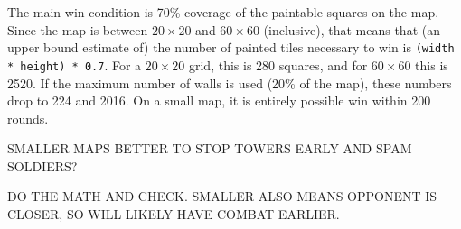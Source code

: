 \documentclass{article}
\begin{document}
  The main win condition is 70\% coverage of the paintable squares on the map. Since the map is between $20 \times 20$ and $60 \times 60$ (inclusive), that means that (an upper bound estimate of) the number of painted tiles necessary to win is \verb|(width * height) * 0.7|. For a $20 \times 20$ grid, this is 280 squares, and for $60 \times 60$ this is 2520. If the maximum number of walls is used (20\% of the map), these numbers drop to 224 and 2016. On a small map, it is entirely possible win within 200 rounds.
  \begin{center}
    SMALLER MAPS BETTER TO STOP TOWERS EARLY AND SPAM SOLDIERS?
    
    DO THE MATH AND CHECK. SMALLER ALSO MEANS OPPONENT IS CLOSER, SO WILL LIKELY HAVE COMBAT EARLIER.
  \end{center}
\end{document}
